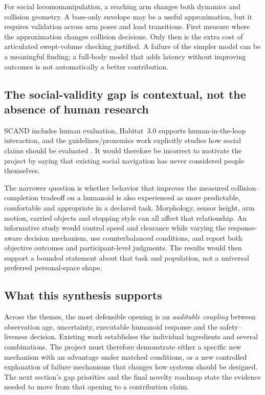 For social locomomanipulation, a reaching arm changes both dynamics and
collision geometry. A base-only envelope may be a useful approximation, but it
requires validation across arm poses and load transitions. First measure where
the approximation changes collision decisions. Only then is the extra cost of
articulated swept-volume checking justified. A failure of the simpler model can
be a meaningful finding; a full-body model that adds latency without improving
outcomes is not automatically a better contribution.

\subsection{The social-validity gap is contextual, not the absence of human research}
SCAND includes human evaluation, Habitat~3.0 supports human-in-the-loop
interaction, and the guidelines/proxemics work explicitly studies how social
claims should be evaluated \citep{scand,habitat3,guidelines,proxemics2026}.
It would therefore be incorrect to motivate the project by saying that existing
social navigation has never considered people themselves.

The narrower question is whether behavior that improves the measured
collision--completion tradeoff on a humanoid is also experienced as more
predictable, comfortable and appropriate in a declared task. Morphology, sensor
height, arm motion, carried objects and stopping style can all affect that
relationship. An informative study would control speed and clearance while
varying the response-aware decision mechanism, use counterbalanced conditions,
and report both objective outcomes and participant-level judgments. The results
would then support a bounded statement about that task and population, not a
universal preferred personal-space shape.

\subsection{What this synthesis supports}
Across the themes, the most defensible opening is an \emph{auditable coupling}
between observation age, uncertainty, executable humanoid response and the
safety--liveness decision. Existing work establishes the individual ingredients
and several combinations. The project must therefore demonstrate either a
specific new mechanism with an advantage under matched conditions, or a new
controlled explanation of failure mechanisms that changes how systems should
be designed. The next section's gap priorities and the final novelty roadmap
state the evidence needed to move from that opening to a contribution claim.
